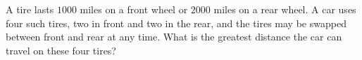 A tire lasts $1000$ miles on a front wheel or $2000$ miles on a rear wheel. A car uses four such tires, two in front and two in the rear, and the tires may be swapped between front and rear at any time. What is the greatest distance the car can travel on these four tires?
